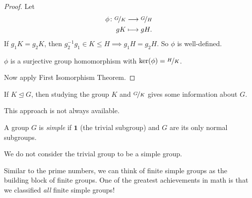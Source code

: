 \begin{proof}
    Let
    \begin{equation*}
    \begin{aligned}
      \phi\colon \nicefrac{G}{K} & \longrightarrow \nicefrac{G}{H}      \\
      gK          & \longmapsto gH.
    \end{aligned}
    \end{equation*}
    If \(g_1 K = g_2 K\), then \(g_2^{-1} g_1 \in K \leq  H\implies g_{1} H = g_2 H\). So \(\phi\) is well-defined.

    \(\phi\) is a surjective group homomorphism with \(\ker(\phi) = \nicefrac{H}{K}\).

    Now apply First Isomorphism Theorem.
\end{proof}

If \(K \trianglelefteq G\), then studying the group \(K\) and \(\nicefrac{G}{K}\) gives some information about \(G\).

This approach is not always available.
\begin{definition}
    A group \(G\) is \textit{simple} if \(\textbf{1} \) (the trivial subgroup) and \(G\) are its only normal subgroups.
\end{definition}
\begin{notation}
    We do not consider the trivial group to be a simple group.
\end{notation}
Similar to the prime numbers, we can think of finite simple groups as the building block of finite groups. One of the greatest achievements in math is that we classified \textit{all} finite simple groups!

